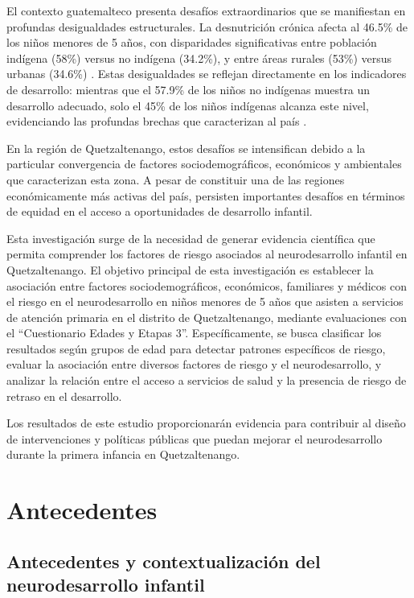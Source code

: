 \documentclass[11pt,letterpaper]{report}
\newcommand{\asq}{“Cuestionario Edades y Etapas 3”}
\begin{document}
El contexto guatemalteco presenta desafíos extraordinarios que se manifiestan 
en profundas desigualdades estructurales. La desnutrición crónica afecta al 
46.5\% de los niños menores de 5 años, con disparidades significativas entre 
población indígena (58\%) versus no indígena (34.2\%), y entre áreas rurales 
(53\%) versus urbanas (34.6\%) \cite{EnMaternoInfantil}. Estas desigualdades 
se reflejan directamente en los indicadores de desarrollo: mientras que el 
57.9\% de los niños no indígenas muestra un desarrollo adecuado, solo el 45\% 
de los niños indígenas alcanza este nivel, evidenciando las profundas brechas 
que caracterizan al país \cite{SESAN2022}.

En la región de Quetzaltenango, estos desafíos se intensifican debido a la 
particular convergencia de factores sociodemográficos, económicos y 
ambientales que caracterizan esta zona. A pesar de constituir una de las
regiones económicamente más activas del país, persisten importantes desafíos en
términos de equidad en el acceso a oportunidades de desarrollo infantil.

Esta investigación surge de la necesidad de generar evidencia científica que
permita comprender los factores de riesgo asociados al neurodesarrollo infantil
en Quetzaltenango. El objetivo principal de esta investigación es establecer la
asociación entre  factores sociodemográficos, económicos, familiares y médicos
con el riesgo en  el neurodesarrollo en niños menores de 5 años que asisten a
servicios de  atención primaria en el distrito de Quetzaltenango, mediante
evaluaciones con el \asq. Específicamente, se busca clasificar los resultados
según grupos de edad para detectar patrones específicos de riesgo, evaluar la
asociación entre diversos factores de riesgo y el neurodesarrollo, y analizar la
relación entre el acceso a servicios de salud y la presencia de riesgo de
retraso en el desarrollo.

Los resultados de este estudio proporcionarán evidencia para contribuir al
diseño de intervenciones y políticas públicas que puedan mejorar el
neurodesarrollo durante la primera infancia en Quetzaltenango.

	\chapter{Antecedentes}
\section{Antecedentes y contextualización del neurodesarrollo infantil}
\end{document}

